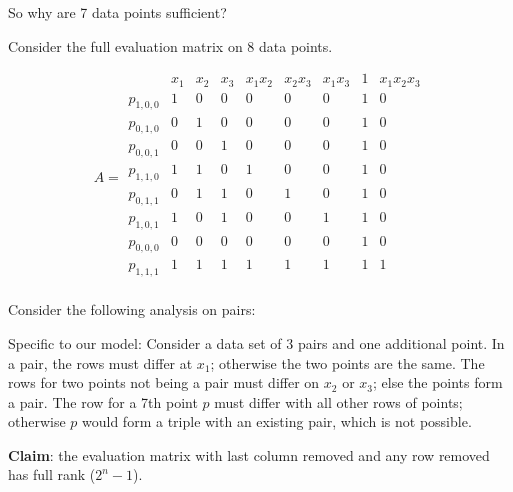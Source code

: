 \documentclass{amsart}
\theoremstyle{definition}
\theoremstyle{remark}
\theoremstyle{example}
\theoremstyle{conjecture}
\numberwithin{equation}{section}
\begin{document}
So why are 7 data points sufficient? %

Consider the full evaluation matrix on 8 data points.  

$$A=
  \begin{array}{c|cccccccc}
     & x_1& x_2 & x_3 & x_1x_2 & x_2x_3 & x_1x_3 &1 & x_1x_2x_3 \\
     \hline
    p_{1,0,0} & 1 & 0 & 0 & 0 & 0 & 0 & 1 & 0 \\
    p_{0,1,0} & 0 & 1 & 0 & 0 & 0 & 0 & 1 & 0\\
    p_{0,0,1} & 0 & 0 & 1 & 0 & 0 & 0 & 1 & 0 \\
    p_{1,1,0} & 1 & 1 & 0 & 1 & 0 & 0 & 1 & 0 \\
    p_{0,1,1} & 0 & 1 & 1 & 0 & 1 & 0 & 1 & 0 \\
    p_{1,0,1} & 1 & 0 & 1 & 0 & 0 & 1 & 1 & 0 \\
    p_{0,0,0} & 0 & 0 & 0 & 0 & 0 & 0 & 1 & 0 \\
    p_{1,1,1} & 1 & 1 & 1 & 1 & 1 & 1 & 1 & 1 \\
  \end{array}$$
  


Consider the following analysis on pairs:

Specific to our model: Consider a data set of 3 pairs and one
additional point.  In a pair, the rows must differ at $x_1$;
otherwise the two points are the same. The rows for two points not
being a pair must differ on $x_2$ or $x_3$; else the points form a
pair. The row for a 7th point $p$ must differ with all other rows of
points; otherwise $p$ would form a triple with an existing pair,
which is not possible.


\textbf{Claim}: the evaluation matrix with last column removed and any row
removed has full rank ($2^n-1$).

\end{document}
